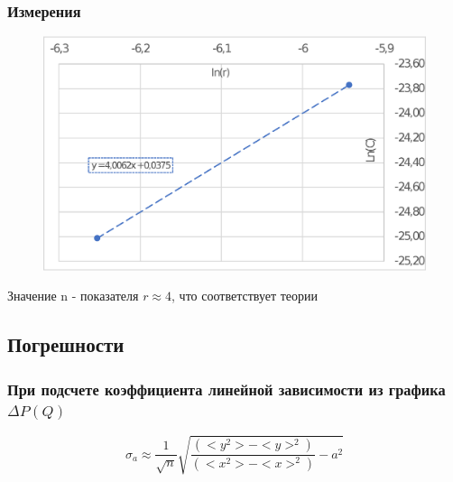 \documentclass[a4paper,12pt]{article}
\theoremstyle{plain} %
\theoremstyle{definition} %
\theoremstyle{remark} %
\begin{document}
\subsubsection{Измерения}
\begin{figure}[h]
\begin{floatrow}
{\includegraphics[width=1\linewidth]{graph2.eps}}

\end{floatrow}

\end{figure}

\indent Значение n - показателя $ r \approx 4$, что соответствует теории

\subsection{Погрешности}
	\subsubsection{При подсчете коэффициента линейной зависимости из графика $\Delta P (Q)$}
	\begin{equation}\label{eq:eq1} 
	\sigma_a \approx \dfrac{1}{\sqrt{n}} \sqrt{\dfrac{(<y^2>-<y>^2)}{(<x^2>-<x>^2 )} - a^2}
\end{equation}
	
\end{document}
